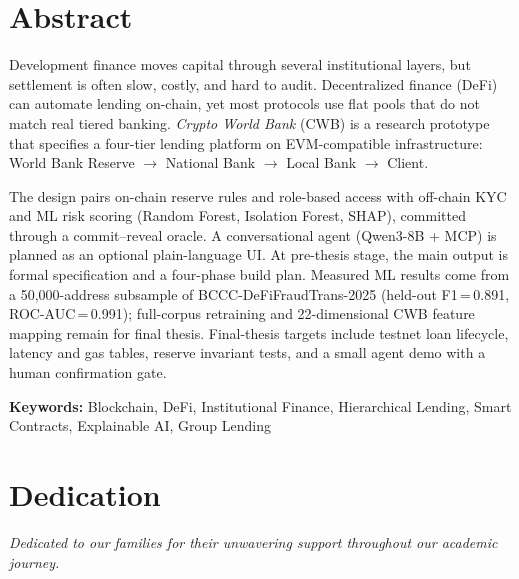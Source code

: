 \documentclass[12pt,a4paper]{report}
\begin{document}
\chapter*{Abstract}
{}

Development finance moves capital through several institutional layers, but settlement is often slow, costly, and hard to audit. Decentralized finance (DeFi) can automate lending on-chain, yet most protocols use flat pools that do not match real tiered banking. \textit{Crypto World Bank} (CWB) is a research prototype that specifies a four-tier lending platform on EVM-compatible infrastructure: World Bank Reserve $\to$ National Bank $\to$ Local Bank $\to$ Client.

The design pairs on-chain reserve rules and role-based access with off-chain KYC and ML risk scoring (Random Forest, Isolation Forest, SHAP), committed through a commit--reveal oracle. A conversational agent (Qwen3-8B + MCP) is planned as an optional plain-language UI. At pre-thesis stage, the main output is formal specification and a four-phase build plan. Measured ML results come from a 50{,}000-address subsample of BCCC-DeFiFraudTrans-2025 (held-out F1\,=\,0.891, ROC-AUC\,=\,0.991); full-corpus retraining and 22-dimensional CWB feature mapping remain for final thesis. Final-thesis targets include testnet loan lifecycle, latency and gas tables, reserve invariant tests, and a small agent demo with a human confirmation gate.

\vspace{0.5em}
\noindent\textbf{Keywords:} Blockchain, DeFi, Institutional Finance, Hierarchical Lending, Smart Contracts, Explainable AI, Group Lending

\newpage
\thispagestyle{empty}

\chapter*{Dedication}
{}

\vspace{3cm}
\begin{center}
\textit{Dedicated to our families for their unwavering support throughout our academic journey.}
\end{center}

\newpage
\thispagestyle{empty}
\end{document}
